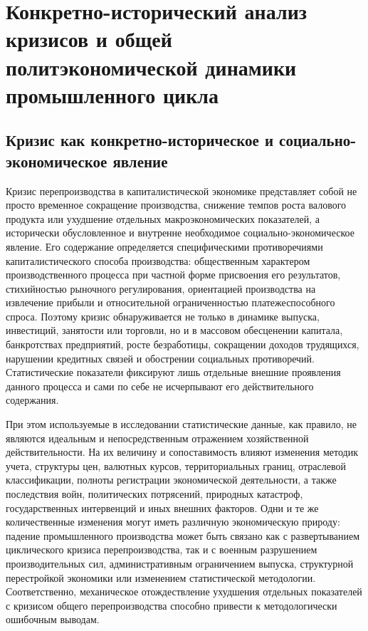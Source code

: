 \section{Конкретно-исторический анализ кризисов и общей политэкономической динамики промышленного цикла}

\subsection{Кризис как конкретно-историческое и социально-экономическое явление}
Кризис перепроизводства в капиталистической экономике представляет собой не просто временное сокращение производства, снижение темпов роста валового продукта или ухудшение отдельных макроэкономических показателей, а исторически обусловленное и внутренне необходимое социально-экономическое явление. Его содержание определяется специфическими противоречиями капиталистического способа производства: общественным характером производственного процесса при частной форме присвоения его результатов, стихийностью рыночного регулирования, ориентацией производства на извлечение прибыли и относительной ограниченностью платежеспособного спроса. Поэтому кризис обнаруживается не только в динамике выпуска, инвестиций, занятости или торговли, но и в массовом обесценении капитала, банкротствах предприятий, росте безработицы, сокращении доходов трудящихся, нарушении кредитных связей и обострении социальных противоречий. Статистические показатели фиксируют лишь отдельные внешние проявления данного процесса и сами по себе не исчерпывают его действительного содержания.

При этом используемые в исследовании статистические данные, как правило, не являются идеальным и непосредственным отражением хозяйственной действительности. На их величину и сопоставимость влияют изменения методик учета, структуры цен, валютных курсов, территориальных границ, отраслевой классификации, полноты регистрации экономической деятельности, а также последствия войн, политических потрясений, природных катастроф, государственных интервенций и иных внешних факторов. Одни и те же количественные изменения могут иметь различную экономическую природу: падение промышленного производства может быть связано как с развертыванием циклического кризиса перепроизводства, так и с военным разрушением производительных сил, административным ограничением выпуска, структурной перестройкой экономики или изменением статистической методологии. Соответственно, механическое отождествление ухудшения отдельных показателей с кризисом общего перепроизводства способно привести к методологически ошибочным выводам.

